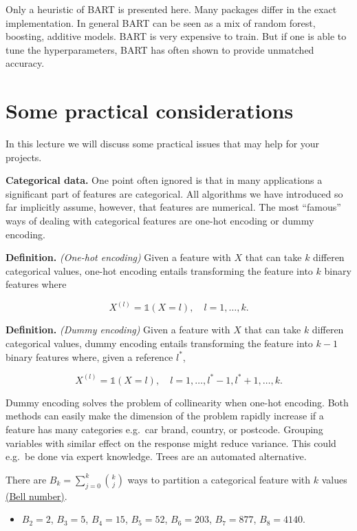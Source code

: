 \documentclass[
]{book}
\providecommand{\tightlist}{%
  \setlength{\itemsep}{0pt}\setlength{\parskip}{0pt}}
\begin{document}
Only a heuristic of BART is presented here. Many packages differ in the exact implementation. In general BART can be seen as a mix of random forest, boosting, additive models. BART is very expensive to train. But if one is able to tune the hyperparameters, BART has often shown to provide unmatched accuracy.

\hypertarget{some-practical-considerations}{%
\section{Some practical considerations}\label{some-practical-considerations}}

In this lecture we will discuss some practical issues that may help for your projects.

\textbf{Categorical data. }One point often ignored is that in many applications a significant part of features are categorical. All algorithms we have introduced so far implicitly assume, however, that features are numerical. The most ``famous'' ways of dealing with categorical features are one-hot encoding or dummy encoding.

\textbf{Definition.} \emph{(One-hot encoding)} Given a feature with \(X\) that can take \(k\) differen categorical values, one-hot encoding entails transforming the feature into \(k\)
binary features where

\[
X^{(l)}=\mathbb 1(X=l), \quad l=1,\dots,k.
\]

\textbf{Definition.} \emph{(Dummy encoding)} Given a feature with \(X\) that can take \(k\) differen categorical values, dummy encoding entails transforming the feature into \(k-1\)
binary features where, given a reference \(l^\ast\),

\[
X^{(l)}=\mathbb 1(X=l), \quad l=1,\dots,l^\ast-1,l^\ast+1,\dots,k.
\]

Dummy encoding solves the problem of collinearity when one-hot encoding. Both methods can easily make the dimension of the problem rapidly increase if a feature has many categories e.g.~car brand, country, or postcode. Grouping variables with similar effect on the response might reduce variance. This could e.g.~be done via expert knowledge. Trees are an automated alternative.

There are \(B_k = \sum_{j=0}^k \binom k j\) ways to partition a categorical feature with \(k\) values \href{https://en.wikipedia.org/wiki/Bell_number}{(Bell number)}.

\begin{itemize}
\tightlist
\item
  \(B_2=2\), \(B_3=5\), \(B_4=15\), \(B_5=52\), \(B_6=203\), \(B_7=877\), \(B_8=4140\).
\end{itemize}
\end{document}
